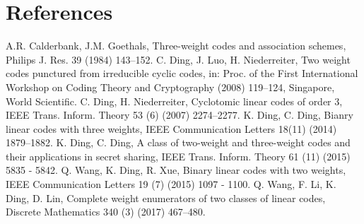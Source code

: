\documentclass[final,1p,times]{elsarticle}
\begin{document}
 \section*{References}
  \begin{thebibliography}{99}
 A.R. Calderbank, J.M. Goethals, Three-weight codes and association schemes, Philips J. Res. 39 (1984) 143–152.
 C. Ding, J. Luo, H. Niederreiter, Two weight codes punctured from irreducible cyclic codes, in: Proc. of the First International Workshop on Coding Theory and Cryptography (2008) 119–124, Singapore, World Scientific.
C. Ding, H. Niederreiter, Cyclotomic linear codes of order 3, IEEE Trans. Inform. Theory 53 (6) (2007) 2274–2277.
 K. Ding, C. Ding, Bianry linear codes with three weights, IEEE Communication Letters 18(11) (2014) 1879–1882.
K. Ding, C. Ding, A class of two-weight and three-weight codes and their applications in secret sharing, IEEE Trans. Inform. Theory 61 (11) (2015) 5835 - 5842.
Q. Wang, K. Ding, R. Xue, Binary linear codes with two weights, IEEE Communication Letters 19 (7) (2015) 1097 - 1100.
 Q. Wang, F. Li, K. Ding, D. Lin, Complete weight enumerators of two classes of linear codes, Discrete Mathematics
 340 (3) (2017) 467–480.

\end{thebibliography}
\end{document}
